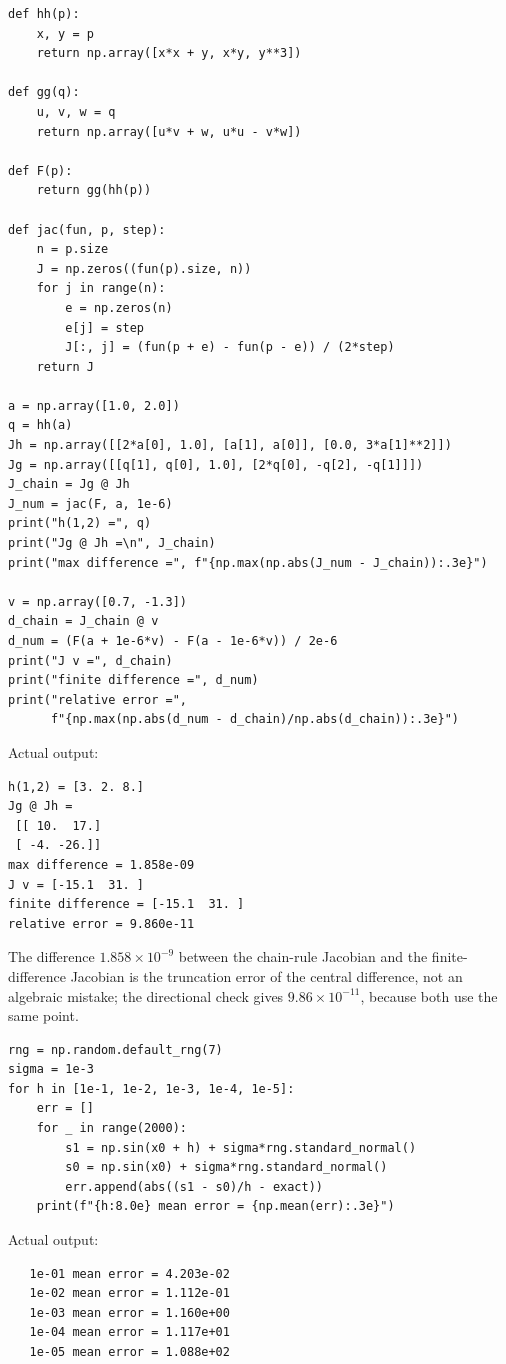 \begin{lab}
\begin{verbatim}
def hh(p):
    x, y = p
    return np.array([x*x + y, x*y, y**3])

def gg(q):
    u, v, w = q
    return np.array([u*v + w, u*u - v*w])

def F(p):
    return gg(hh(p))

def jac(fun, p, step):
    n = p.size
    J = np.zeros((fun(p).size, n))
    for j in range(n):
        e = np.zeros(n)
        e[j] = step
        J[:, j] = (fun(p + e) - fun(p - e)) / (2*step)
    return J

a = np.array([1.0, 2.0])
q = hh(a)
Jh = np.array([[2*a[0], 1.0], [a[1], a[0]], [0.0, 3*a[1]**2]])
Jg = np.array([[q[1], q[0], 1.0], [2*q[0], -q[2], -q[1]]])
J_chain = Jg @ Jh
J_num = jac(F, a, 1e-6)
print("h(1,2) =", q)
print("Jg @ Jh =\n", J_chain)
print("max difference =", f"{np.max(np.abs(J_num - J_chain)):.3e}")

v = np.array([0.7, -1.3])
d_chain = J_chain @ v
d_num = (F(a + 1e-6*v) - F(a - 1e-6*v)) / 2e-6
print("J v =", d_chain)
print("finite difference =", d_num)
print("relative error =",
      f"{np.max(np.abs(d_num - d_chain)/np.abs(d_chain)):.3e}")
\end{verbatim}
Actual output:
\begin{verbatim}
h(1,2) = [3. 2. 8.]
Jg @ Jh =
 [[ 10.  17.]
 [ -4. -26.]]
max difference = 1.858e-09
J v = [-15.1  31. ]
finite difference = [-15.1  31. ]
relative error = 9.860e-11
\end{verbatim}
\end{lab}

The difference $1.858\times10^{-9}$ between the chain-rule Jacobian and the finite-difference
Jacobian is the truncation error of the central difference, not an algebraic mistake; the
directional check gives $9.86\times10^{-11}$, because both use the same point.

\begin{lab}
\begin{verbatim}
rng = np.random.default_rng(7)
sigma = 1e-3
for h in [1e-1, 1e-2, 1e-3, 1e-4, 1e-5]:
    err = []
    for _ in range(2000):
        s1 = np.sin(x0 + h) + sigma*rng.standard_normal()
        s0 = np.sin(x0) + sigma*rng.standard_normal()
        err.append(abs((s1 - s0)/h - exact))
    print(f"{h:8.0e} mean error = {np.mean(err):.3e}")
\end{verbatim}
Actual output:
\begin{verbatim}
   1e-01 mean error = 4.203e-02
   1e-02 mean error = 1.112e-01
   1e-03 mean error = 1.160e+00
   1e-04 mean error = 1.117e+01
   1e-05 mean error = 1.088e+02
\end{verbatim}
\end{lab}


